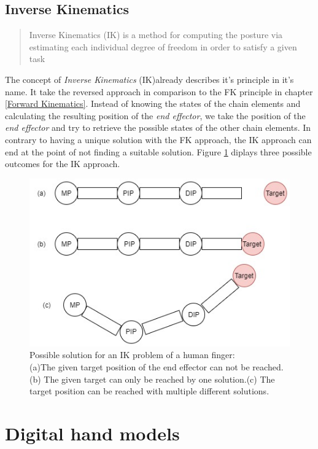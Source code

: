  \subsection{Inverse Kinematics}
\begin{quote}Inverse Kinematics (IK) is a method for computing the posture via estimating each individual degree of freedom in order to satisfy a given task~\cite[S.~14]{AndreasAristidouandJoanLasenby.}\end{quote}
The concept of \textit{Inverse Kinematics}  (IK)already describes it's principle in it's name. It take the reversed approach in comparison to the FK principle in chapter \ref{Forward Kinematics}. Instead of knowing the states of the chain elements and calculating the resulting position of the \textit{end effector}, we take the position of the \textit{end effector} and try to retrieve the possible states of the other chain elements. In contrary to having a unique solution with the FK approach, the IK approach can end at the point of not finding a suitable solution. Figure \ref{IkSolutions} diplays three possible outcomes for the IK approach.
\begin{figure}[H]
\includegraphics[scale=0.6]{images/Ik_figure.jpg}
\caption{Possible solution for an IK problem of a human finger:\\(a)The given target position of the end effector can not be reached. (b) The given target can only be reached by one solution.(c) The target position can be reached with multiple different solutions.}
\label{IkSolutions}
\end{figure}


\section{Digital hand models}